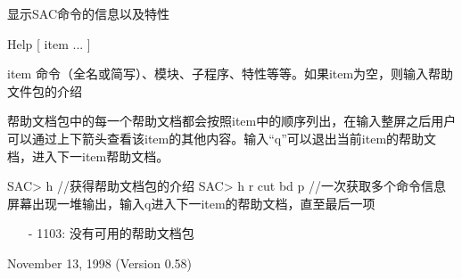 \label{cmd:help}

显示SAC命令的信息以及特性

Help [ item ... ]

item 命令（全名或简写）、模块、子程序、特性等等。如果item为空，则输入帮助文件包的介绍

帮助文档包中的每一个帮助文档都会按照item中的顺序列出，在输入整屏之后用户可以通过上下箭头查看该item的其他内容。输入``q''可以退出当前item的帮助文档，进入下一item帮助文档。

\begin{SACCode}
SAC> h                  //获得帮助文档包的介绍
SAC> h r cut bd p       //一次获取多个命令信息
屏幕出现一堆输出，输入q进入下一item的帮助文档，直至最后一项
\end{SACCode}

\begin{itemize}
\item[-]1103: 没有可用的帮助文档包
\end{itemize}

November 13, 1998 (Version 0.58)
